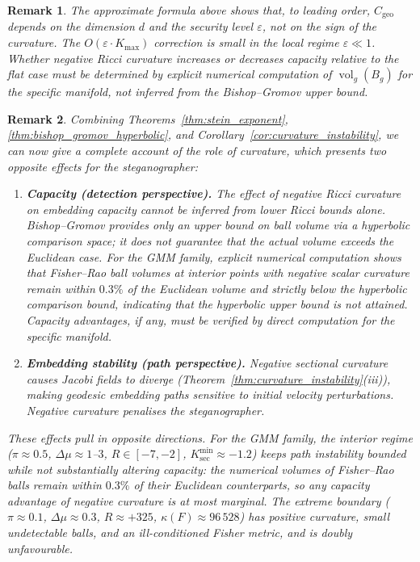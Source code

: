 \documentclass[a4paper,fleqn]{cas-dc}
\newtheorem{remark}{Remark}
\begin{document}
\begin{remark}%
\label{rem:no_curvature_mono}
The approximate formula above shows that, to leading order, 
$C_{\mathrm{geo}}$ depends on the dimension $d$ and the security level 
$\varepsilon$, not on the sign of the curvature.  
The $O(\varepsilon\cdot K_{\max})$ correction is small in the local regime 
$\varepsilon\ll 1$.  
Whether negative Ricci curvature increases or decreases capacity relative 
to the flat case must be determined by explicit numerical computation of 
$\operatorname{vol}_{g}(B_{g})$ for the specific manifold, not inferred from 
the Bishop--Gromov upper bound.
\end{remark}

\begin{remark}%
\label{rem:two_faces_curvature}
Combining Theorems~\ref{thm:stein_exponent}, \ref{thm:bishop_gromov_hyperbolic}, 
and Corollary~\ref{cor:curvature_instability}, we can now give a complete account 
of the role of curvature, which presents two opposite effects for the 
steganographer:
\begin{enumerate}
\item \textbf{Capacity (detection perspective).}  
The effect of negative Ricci curvature on embedding capacity cannot be inferred 
from lower Ricci bounds alone.  
Bishop--Gromov provides only an upper bound on ball volume via a hyperbolic 
comparison space; it does not guarantee that the actual volume exceeds the 
Euclidean case.  
For the GMM family, explicit numerical computation shows that Fisher--Rao ball volumes at interior points with negative scalar curvature remain within $0.3\%$ of the Euclidean volume and strictly below the hyperbolic comparison bound, indicating that the hyperbolic upper bound is not attained.
Capacity advantages, if any, must be verified by direct computation for the 
specific manifold.

\item \textbf{Embedding stability (path perspective).}  
Negative sectional curvature causes Jacobi fields to diverge 
(Theorem~\ref{thm:curvature_instability}(iii)), making geodesic embedding 
paths sensitive to initial velocity perturbations.  
Negative curvature penalises the steganographer.
\end{enumerate}
These effects pull in opposite directions.  
For the GMM family, the interior regime 
($\pi\approx 0.5$, $\Delta\mu\approx 1$--$3$, $R\in[-7,-2]$, 
$K_{\mathrm{sec}}^{\min}\approx -1.2$) keeps path instability bounded while
not substantially altering capacity: the numerical volumes of
Fisher--Rao balls remain within $0.3\%$ of their Euclidean counterparts,
so any capacity advantage of negative curvature is at most marginal.
The extreme boundary ($\pi\approx 0.1$, $\Delta\mu\approx 0.3$, $R\approx +325$, 
$\kappa(F)\approx 96\,528$) has positive curvature, small undetectable balls, 
and an ill-conditioned Fisher metric, and is doubly unfavourable.
\end{remark}
\end{document}
